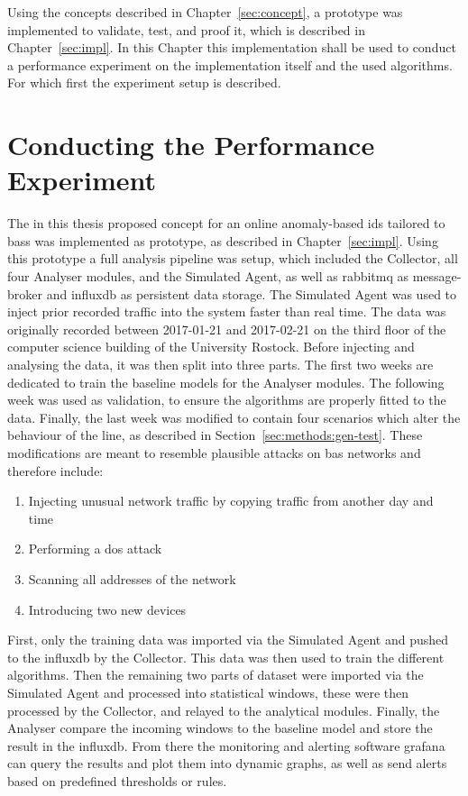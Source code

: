 Using the concepts described in Chapter~\ref{sec:concept}, a prototype was implemented to validate, test, and proof it, which is described in Chapter~\ref{sec:impl}.
In this Chapter this implementation shall be used to conduct a performance experiment on the implementation itself and the used algorithms.
For which first the experiment setup is described.

\section{Conducting the Performance Experiment}
\label{sec:results:experiment}

The in this thesis proposed concept for an online anomaly-based \gls{ids} tailored to \glspl{bas} was implemented as prototype, as described in Chapter~\ref{sec:impl}.
Using this prototype a full analysis pipeline was setup, which included the Collector, all four Analyser modules, and the Simulated Agent, as well as \gls{rabbitmq} as message-broker and \gls{influxdb} as persistent data storage.
The Simulated Agent was used to inject prior recorded traffic into the system faster than real time.
The data was originally recorded between 2017-01-21 and 2017-02-21 on the third floor of the computer science building of the University Rostock.
Before injecting and analysing the data, it was then split into three parts. The first two weeks are dedicated to train the baseline models for the Analyser modules. The following week was used as validation, to ensure the algorithms are properly fitted to the data. Finally, the last week was modified to contain four scenarios which alter the behaviour of the line, as described in Section~\ref{sec:methods:gen-test}.
\newpage
These modifications are meant to resemble plausible attacks on \gls{bas} networks and therefore include:
\begin{enumerate}
	\item Injecting unusual network traffic by copying traffic from another day and time
	\item Performing a \gls{dos} attack
	\item Scanning all addresses of the network
	\item Introducing two new devices
\end{enumerate}

First, only the training data was imported via the Simulated Agent and pushed to the \gls{influxdb} by the Collector. This data was then used to train the different algorithms.
Then the remaining two parts of dataset were imported via the Simulated Agent and processed into statistical windows, these were then processed by the Collector, and relayed to the analytical modules. Finally, the Analyser compare the incoming windows to the baseline model and store the result in the \gls{influxdb}. From there the monitoring and alerting software \gls{grafana} can query the results and plot them into dynamic graphs, as well as send alerts based on predefined thresholds or rules.

